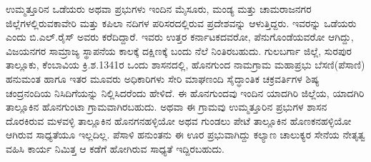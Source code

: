 ಉಮ್ಮತ್ತೂರಿನ ಒಡೆಯರು ಅಥವಾ ಪ್ರಭುಗಳು ಇಂದಿನ ಮೈಸೂರು, ಮಂಡ್ಯ ಮತ್ತು ಚಾಮರಾಜನಗರ ಜಿಲ್ಲೆಗಳಲ್ಲಿರುವ\break ಕಾವೇರಿ ಮತ್ತು ಕಪಿಲಾ ನದಿಗಳ ಪರಿಸರದಲ್ಲಿರುವ ಪ್ರದೇಶವನ್ನು ಆಳುತ್ತಿದ್ದರು. ಇವರನ್ನು ಒಡೆಯರು ಎಂದು ಬಿ.ಎಲ್​.ರೈಸ್​ ಅವರು ಕರೆದಿದ್ದಾರೆ. ಇವರು ಉತ್ತರ ಕರ್ನಾಟಕದವರೋ, ಪೆನುಗೊಂಡೆಯವರೋ ಆಗಿದ್ದು, ವಿಜಯನಗರ ಸಾಮ್ರಾಜ್ಯ ಸ್ಥಾಪನೆಯ ಕಾಲಕ್ಕೆ ದಕ್ಷಿಣಕ್ಕೆ ಬಂದು ನೆಲೆ ನಿಂತಿರಬಹುದು. ಗುಲಬರ್ಗಾ ಜಿಲ್ಲೆ, ಸುರಪುರ ತಾಲ್ಲೂಕು, ಕೆಂಬಾವಿಯ ಕ್ರಿ.ಶ.1341ರ ಒಂದು ಶಾಸನದಲ್ಲಿ, ಹೊನಗುಂದ ನಾಮಗ್ರಾಮ ಮಹಾಪ್ರಭು ಬೆಸಣಿ(ಪೆಸಾಣಿ) ಹನುಮಂತ ಹಾಗೂ ಇತರ ಮೂವರು ಅಧಿಕಾರಿಗಳು ಸೇರಿ ಮಾಘಣಂದಿ ಸೈದ್ಧಾಂತಿಕ ಚಕ್ರವರ್ತಿಗಳ ಶಿಷ್ಯ ಚಂದ್ರನಂದಿಯ ನಿಸಿದಿಗೆಯನ್ನು ನಿಲ್ಲಿಸಿದರೆಂದು ಹೇಳಿದೆ. ಈ ಹೊನಗುಂದವು ಇಂದಿನ ಯಾದಗಿರಿ ಜಿಲ್ಲೆಯ, ಯಾದಗಿರಿ ತಾಲ್ಲೂಕಿನ ಹೊನಗುಂಟಾ ಗ್ರಾಮವಾಗಿರಬಹುದು. ಅಥವಾ ಈ ಗ್ರಾಮವು ಉಮ್ಮತ್ತೂರಿನ ಪ್ರಭುಗಳ ಶಾಸನ ದೊರಕಿರುವ ಮಳವಳ್ಳಿ ತಾಲ್ಲೂಕಿನ ಹೊನಗನಹಳ್ಳಿಯೋ ಅಥವ ಗುಂಡಲು ಪೇಟೆ ತಾಲ್ಲೂಕಿನ ಹೊಣಕನಹಳ್ಳಿಯೋ ಆಗಿರುವ ಸಾಧ್ಯತೆಯೂ ಇಲ್ಲದಿಲ್ಲ. ಪೆಸಾಳಿ ಹನುಂತನು ಈ ಊರ ಪ್ರಭುವಾಗಿದ್ದು ಕಲ್ಯಾಣ ಚಾಲುಕ್ಯರ ಸೇನೆಯ ನೇತೃತ್ವ ವಹಿಸಿ ಕಾರ್ಯ ನಿಮಿತ್ತ ಆ ಕಡೆಗೆ ಹೋಗಿರುವ ಸಾಧ್ಯತೆ ಇದ್ದಿರಬಹುದು.

